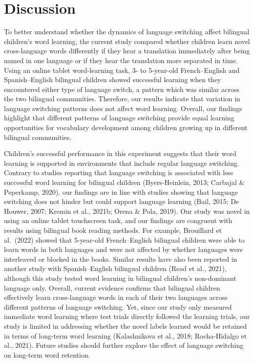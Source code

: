 \documentclass[
  man,floatsintext]{apa7}
\begin{document}
\hypertarget{discussion}{%
\section{Discussion}\label{discussion}}

To better understand whether the dynamics of language switching affect bilingual children's word learning, the current study compared whether children learn novel cross-language words differently if they hear a translation immediately after being named in one language or if they hear the translation more separated in time. Using an online tablet word-learning task, 3- to 5-year-old French--English and Spanish--English bilingual children showed successful learning when they encountered either type of language switch, a pattern which was similar across the two bilingual communities. Therefore, our results indicate that variation in language switching patterns does not affect word learning. Overall, our findings highlight that different patterns of language switching provide equal learning opportunities for vocabulary development among children growing up in different bilingual communities.

Children's successful performance in this experiment suggests that their word learning is supported in environments that include regular language switching. Contrary to studies reporting that language switching is associated with less successful word learning for bilingual children (Byers-Heinlein, 2013; Carbajal \& Peperkamp, 2020), our findings are in line with studies showing that language switching does not hinder but could support language learning (Bail, 2015; De Houwer, 2007; Kremin et al., 2021b; Orena \& Pola, 2019). Our study was novel in using an online tablet touchscreen task, and our findings are congruent with results using bilingual book reading methods. For example, Brouillard et al.~(2022) showed that 5-year-old French--English bilingual children were able to learn words in both languages and were not affected by whether languages were interleaved or blocked in the books. Similar results have also been reported in another study with Spanish--English bilingual children (Read et al., 2021), although this study tested word learning in bilingual children's non-dominant language only. Overall, current evidence confirms that bilingual children effectively learn cross-language words in each of their two languages across different patterns of language switching. Yet, since our study only measured immediate word learning where test trials directly followed the learning trials, our study is limited in addressing whether the novel labels learned would be retained in terms of long-term word learning (Kalashnikova et al., 2018; Rocha-Hidalgo et al., 2021). Future studies should further explore the effect of language switching on long-term word retention.
\end{document}
